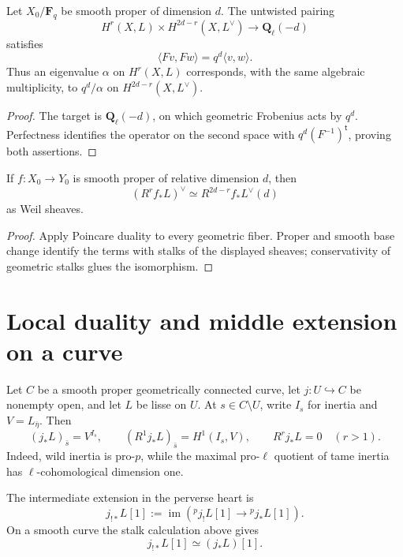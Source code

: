 \begin{proposition}
\label{prop:frob-duality}
Let \(X_0/\mathbf F_q\) be smooth proper of dimension \(d\).  The untwisted
pairing
\[
 H^r(X,L)\times H^{2d-r}(X,L^\vee)
 \longrightarrow\mathbf Q_\ell(-d)
\tag{7.12}\label{eq:untwisted-pairing}
\]
satisfies
\[
 \langle Fv,Fw\rangle=q^d\langle v,w\rangle.
\tag{7.13}\label{eq:frob-similitude}
\]
Thus an eigenvalue \(\alpha\) on \(H^r(X,L)\) corresponds, with the same
algebraic multiplicity, to \(q^d/\alpha\) on
\(H^{2d-r}(X,L^\vee)\).
\end{proposition}

\begin{proof}
The target is \(\mathbf Q_\ell(-d)\), on which geometric Frobenius acts by
\(q^d\).  Perfectness identifies the operator on the second space with
\(q^d(F^{-1})^{\mathsf t}\), proving both assertions.
\end{proof}

\begin{corollary}
\label{cor:relative-poincare}
If \(f:X_0\to Y_0\) is smooth proper of relative dimension \(d\), then
\[
 (R^rf_*L)^\vee\simeq R^{2d-r}f_*L^\vee(d)
\]
as Weil sheaves.
\end{corollary}

\begin{proof}
Apply Poincare duality to every geometric fiber.  Proper and smooth base
change identify the terms with stalks of the displayed sheaves; conservativity
of geometric stalks glues the isomorphism.
\end{proof}

\section{Local duality and middle extension on a curve}

Let \(C\) be a smooth proper geometrically connected curve, let
\(j:U\hookrightarrow C\) be nonempty open, and let \(L\) be lisse on \(U\).
At \(s\in C\setminus U\), write \(I_s\) for inertia and
\(V=L_{\bar\eta}\).  Then
\[
 (j_*L)_{\bar s}=V^{I_s},\qquad
 (R^1j_*L)_{\bar s}=H^1(I_s,V),\qquad
 R^rj_*L=0\quad(r>1).
\tag{7.14}\label{eq:curve-local-stalks}
\]
Indeed, wild inertia is pro-\(p\), while the maximal pro-\(\ell\) quotient of
tame inertia has \(\ell\)-cohomological dimension one.

The intermediate extension in the perverse heart is
\[
 j_{!*}L[1]
 :=\operatorname{im}({}^pj_!L[1]\to{}^pj_*L[1]).
\]
On a smooth curve the stalk calculation above gives
\[
 j_{!*}L[1]\simeq(j_*L)[1].
\tag{7.15}\label{eq:curve-middle-extension}
\]

